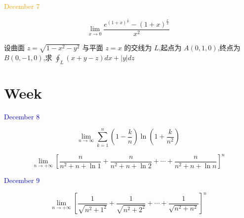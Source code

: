 \textcolor{orange}{December 7}

\begin{example}[][Exam: 38.1.13]
	$$\lim\limits_{x\to 0}\dfrac{e^{(1+x)^{\frac{1}{x}}}-(1+x)^{\frac{e}{x}}}{x^{2}}$$
\end{example}

\begin{solution}
	
\end{solution}

\begin{example}[][Exam: 38.1.14]
	设曲面 $z=\sqrt{1-x^{2}-y^{2}}$ 与平面 $z=x$ 的交线为 $L$,起点为 $A(0,1,0)$,终点为 $B(0,-1,0)$,求 $\displaystyle{\oint_{L}(x+y-z)dx+|y|dz}$
\end{example}

\begin{solution}
	
\end{solution}


\section{Week }
\textcolor{blue}{December 8}

\begin{example}[][Exam: 38.2.1]
	$$\lim\limits_{n\to \infty}\sum\limits_{k=1}^{n}\left(1-\dfrac{k}{n}\right)\ln(1+\dfrac{k}{n^{2}})$$
\end{example}

\begin{solution}
	
\end{solution}

\begin{example}[][Exam: 38.2.2]
	$$\lim\limits_{n\to +\infty}\left[\dfrac{n}{n^{2}+n+\ln1}+\dfrac{n}{n^{2}+n+\ln2}+\cdots+\dfrac{n}{n^{2}+n+\ln n} \right]^{n}$$
\end{example}

\begin{solution}
	
\end{solution}


\textcolor{blue}{December 9}

\begin{example}[][Exam: 38.2.3]
	$$\lim\limits_{n\to +\infty}\left[ \dfrac{1}{\sqrt{n^{2}+1^{2}}}+\dfrac{1}{\sqrt{n^{2}+2^{2}}}+\cdots+\dfrac{1}{\sqrt{n^{2}+n^{2}}}\right]^{n}$$
\end{example}

